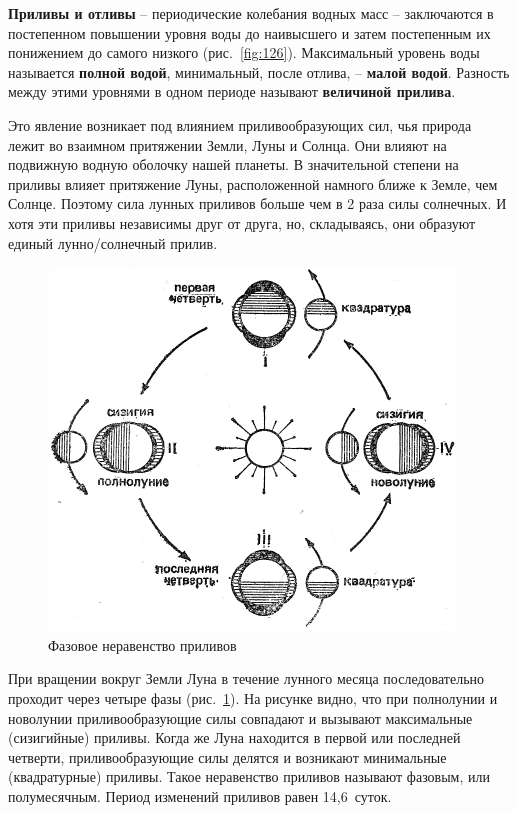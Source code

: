 \documentclass[a4paper, 12pt, twoside, final, book, russian, fittopage, cyremdash]{ncc}
\newcommand{\ris}[1]{\ref{fig:#1}}
\begin{document}
\textbf{Приливы и отливы} \--- периодические колебания водных масс \--- заключаются в постепенном повышении уровня воды до наивысшего и затем постепенным их понижением до самого низкого (рис.~\ris{126}). Максимальный уровень воды называется \textbf{полной водой}, минимальный, после отлива, \--- \textbf{малой водой}. Разность между этими уровнями в одном периоде называют \textbf{величиной прилива}.

Это явление возникает под влиянием приливообразующих сил, чья природа лежит во взаимном притяжении Земли, Луны и Солнца. Они влияют на подвижную водную оболочку нашей планеты. В значительной степени на приливы влияет притяжение Луны, расположенной намного ближе к Земле, чем Солнце. Поэтому сила лунных приливов больше чем в 2 раза силы солнечных. И хотя эти приливы независимы друг от друга, но, складываясь, они образуют единый лунно\-/солнечный прилив.

\begin{figure}[htb]
  \centering{}
  \includegraphics[scale=1.2]{0127P}
  \caption{Фазовое неравенство приливов}
  \label{fig:127}
\end{figure}

При вращении вокруг Земли Луна в течение лунного месяца последовательно проходит через четыре фазы (рис.~\ris{127}). На рисунке видно, что при полнолунии и новолунии приливообразующие силы совпадают и вызывают максимальные (сизигийные) приливы. Когда же Луна находится в первой или последней четверти, приливообразующие силы делятся и возникают минимальные (квадратурные) приливы. Такое неравенство приливов называют фазовым, или полумесячным. Период изменений приливов равен 14,6~суток.
\end{document}
